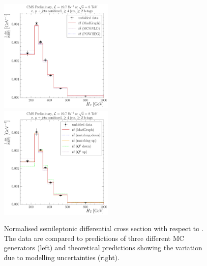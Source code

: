 \begin{figure}[!htbp]
	\centering
  	{\includegraphics[width=0.5\textwidth]{measurement/HT/central/normalised_xsection_combined_different_generators}}\hfill
  	{\includegraphics[width=0.5\textwidth]{measurement/HT/central/normalised_xsection_combined_systematics_shifts}}
    \caption[Normalised semileptonic \ttbar differential cross section with respect to \HT]{Normalised semileptonic
      \ttbar differential cross section with respect to \HT. The data are compared to predictions of three different MC
      generators (left) and theoretical predictions showing the variation due to modelling uncertainties (right).}
    \label{fig:results_HT_combined}
\end{figure}

